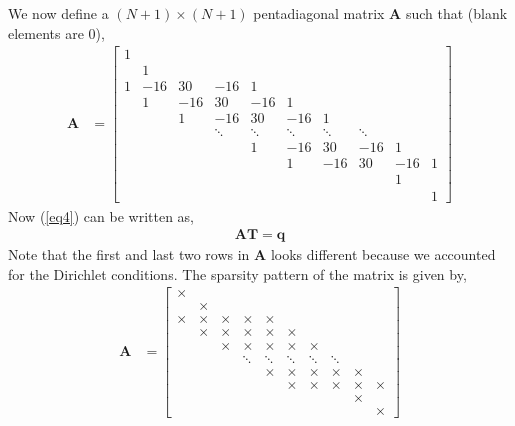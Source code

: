 \documentclass[12 pt, final]{article}
\renewcommand{\d}{\times}
\begin{document}
\begin{itemize}
\begin{itemize}
\begin{enumerate}
                We now define a $(N+1)\times(N+1)$ pentadiagonal matrix $\mathbf{A}$ such that (blank elements are 0),
                \begin{align*}
                    \mathbf{A} &= \begin{bmatrix} 
                    1\\
                    & 1 &   \\
                    1 & -16 & 30 & -16 & 1  \\
                    &1 & -16 & 30 & -16 & 1  \\
                    &&1 & -16 & 30 & -16 & 1  \\
                    &&& \ddots&\ddots&\ddots&\ddots&\ddots\\
                    &&&& 1 & -16 & 30 & -16 & 1 \\
                    &&&&& 1 & -16 & 30 & -16 & 1\\
                    &&&&&&& & 1 &\\
                    &&&&&&&&& 1
                    \end{bmatrix}
                \end{align*}
                Now (\ref{eq4}) can be written as,
                \begin{align*}
                    \mathbf{AT} = \mathbf{q}
                \end{align*}
                Note that the first and last two rows in $\mathbf{A}$ looks different because we accounted for the Dirichlet conditions. The sparsity pattern of the matrix is given by, 
                \begin{align*}
                    \mathbf{A} &= \begin{bmatrix} 
                    \d\\
                     & \d &   \\
                    \d & \d & \d & \d & \d  \\
                    &\d & \d & \d & \d & \d  \\
                    && \d & \d & \d & \d & \d  \\
                    &&& \ddots & \ddots & \ddots & \ddots & \ddots  \\
                    &&&& \d & \d & \d & \d & \d \\
                    &&&&& \d & \d & \d & \d & \d\\
                    &&&&&&&  & \d & \\
                    &&&&&&&&& \d

\end{bmatrix}
\end{align*}
\end{enumerate}
\end{itemize}
\end{itemize}
\end{document}
